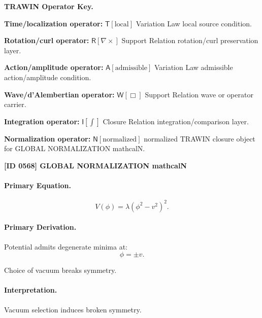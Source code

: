 \par\vspace{0.45\baselineskip}
\noindent\begin{minipage}[t]{\linewidth}
\begingroup
\small
\raggedright
\textbf{TRAWIN Operator Key.}\par
\noindent\textbf{Time/localization operator:} $\mathsf{T}\!\left[\mathrm{local}\right]$ Variation Law local source condition.\par
\noindent\textbf{Rotation/curl operator:} $\mathsf{R}\!\left[\nabla\times\right]$ Support Relation rotation/curl preservation layer.\par
\noindent\textbf{Action/amplitude operator:} $\mathsf{A}\!\left[\mathrm{admissible}\right]$ Variation Law admissible action/amplitude condition.\par
\noindent\textbf{Wave/d'Alembertian operator:} $\mathsf{W}\!\left[\Box\right]$ Support Relation wave or operator carrier.\par
\noindent\textbf{Integration operator:} $\mathsf{I}\!\left[\int\right]$ Closure Relation integration/comparison layer.\par
\noindent\textbf{Normalization operator:} $\mathsf{N}\!\left[\mathrm{normalized}\right]$ normalized TRAWIN closure object for GLOBAL NORMALIZATION mathcalN.\par
\endgroup
\end{minipage}

\clearpage
\noindent\textbf{[ID 0568] GLOBAL NORMALIZATION mathcalN}\par
\vspace{0.35em}
\paragraph{Primary Equation.}
\begin{equation}
V(\phi) = \lambda(\phi^2 - v^2)^2.
\end{equation}

\paragraph{Primary Derivation.}
Potential admits degenerate minima at:
\begin{equation}
\phi = \pm v.
\end{equation}

Choice of vacuum breaks symmetry.

\paragraph{Interpretation.}
Vacuum selection induces broken symmetry.

